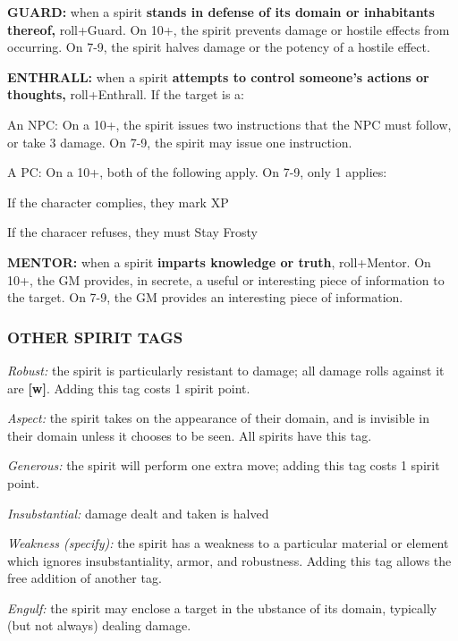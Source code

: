 \documentclass[oneside,10pt]{article}
\begin{document}
\begin{multicols}{2}
\textbf{GUARD:} when a spirit \textbf{stands in defense of its domain or
inhabitants thereof,} roll+Guard. On 10+, the spirit prevents
damage or hostile effects from occurring. On 7-9, the spirit
halves damage or the potency of a hostile effect.

\textbf{ENTHRALL:} when a spirit \textbf{attempts to control someone’s
actions or thoughts,} roll+Enthrall. If the target is a:
\begin{dent}

\tcirc{} An NPC: On a 10+, the spirit issues two instructions
that the NPC must follow, or take 3 damage. On 7-9,
the spirit may issue one instruction.

\tcirc{} A PC: On a 10+, both of the following apply. On 7-9,
only 1 applies:
\begin{dent}

\tcirc{} If the character complies, they mark XP

\tcirc{} If the characer refuses, they must Stay Frosty
\end{dent}
\end{dent}
\textbf{MENTOR:} when a spirit \textbf{imparts knowledge or truth}, roll+Mentor. On 10+, the GM provides, in secrete, a useful or
interesting piece of information to the target. On 7-9, the GM
provides an interesting piece of information.

\subsubsection{OTHER SPIRIT TAGS}
\begin{dent}


\textit{Robust:} the spirit is particularly resistant to damage; all
damage rolls against it are \textbf{[w]}. Adding this tag costs 1
spirit point.

\textit{Aspect:} the spirit takes on the appearance of their domain,
and is invisible in their domain unless it chooses to be
seen. All spirits have this tag.

\textit{Generous:} the spirit will perform one extra move; adding
this tag costs 1 spirit point.

\textit{Insubstantial:} damage dealt and taken is halved

\textit{Weakness (specify):} the spirit has a weakness to a particular
material or element which ignores insubstantiality, armor,
and robustness. Adding this tag allows the free addition of
another tag.

\textit{Engulf:} the spirit may enclose a target in the ubstance of its
domain, typically (but not always) dealing damage.


\end{dent}
\end{multicols}
\end{document}
